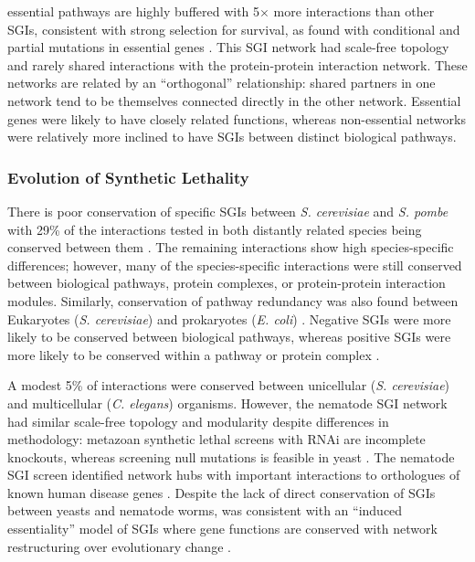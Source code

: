 \Gls{essential} \glspl{pathway} are highly buffered with 5$\times$ more interactions than other \glspl{SGI}, consistent with strong selection for survival, as found with conditional and partial \glspl{mutation} in \gls{essential} genes \citep{Davierwala2005}. This \gls{SGI} network had \gls{scale-free} topology and rarely shared interactions with the protein-protein interaction network. These networks are related by an ``orthogonal'' relationship: shared partners in one network tend to be themselves connected directly in the other network. Essential genes were likely to have closely related functions, whereas non-\gls{essential} networks were relatively more inclined to have \glspl{SGI} between distinct biological \glspl{pathway}. 

\subsubsection{Evolution of Synthetic Lethality}
There is poor conservation of specific \glspl{SGI} between \textit{S. cerevisiae} and \textit{S. pombe} with 29\% of the interactions tested in both distantly related species being conserved between them \citep{Dixon2008}. The remaining interactions show high species-specific differences; however, many of the species-specific interactions were still conserved between biological \glspl{pathway}, protein complexes, or protein-protein interaction modules. Similarly, conservation of \gls{pathway} redundancy was also found between  Eukaryotes (\textit{S. cerevisiae}) and prokaryotes (\textit{E. coli}) \citep{Butland2008}. Negative \glspl{SGI} were more likely to be conserved between biological \glspl{pathway}, whereas positive \glspl{SGI} were more likely to be conserved within a \gls{pathway} or protein complex \citep{Roguev2008}. 

A modest 5\% of interactions were conserved between unicellular (\textit{S. cerevisiae}) and multicellular (\textit{C. elegans}) organisms. However, the nematode \gls{SGI} network had similar \gls{scale-free} topology and modularity despite differences in methodology: metazoan \gls{synthetic lethal} screens with \acrfull{RNAi} are incomplete knockouts, whereas screening null \glspl{mutation} is feasible in yeast \citep{Bussey2006}. The nematode \gls{SGI} screen identified network hubs with important interactions to orthologues of known human disease genes \citep{Lehner2006}. Despite the lack of direct conservation of \glspl{SGI} between yeasts and nematode worms,  was consistent with an ``\gls{induced essentiality}'' model of \glspl{SGI} where gene functions are conserved with network restructuring over evolutionary change \citep{Tischler2008}.


